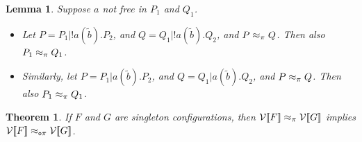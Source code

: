 \documentclass[11pt,a4paper]{amsart}
\theoremstyle{plain}
\theoremstyle{definition}
\theoremstyle{defC}
\theoremstyle{thmC}
\theoremstyle{plain}
\numberwithin{equation}{section}
\def\inp#1#2{#1(#2)}
\newcommand{\rmm}[1]{{\tt{\lowercase{#1}}}}
\newcommand{\genwb}[1]{\mathrel{\approx_{\rmm{\lowercase{#1}}}}}       %
\newcommand{\wbPI}{\genwb{\pi}}       %
\newcommand{\wbOPI}{\genwb{o\pi}}       %
\newcommand{\til}[1]{\widetilde{#1}}
\newcommand{\tilb}{{\til b}}
\newcommand{\tilx}{\tilde{x}}
\newcommand{\FF}{F}
\newcommand{\GG}{G}
\newcommand{\cbvSymb}{{\mathcal {V}}}
\newcommand{\encoEnvI}[1]{ \cbvSymb[\! [ #1 ] \! ]  } %
\newcommand{\encoConI}{\encoEnvI} %
\theoremstyle{plain}
\newtheorem{theorem}[thm]{Theorem}
\newtheorem{lemma}[thm]{Lemma}
\theoremstyle{definition}
\begin{document}
\begin{lemma}
\label{l:deco}
Suppose  $a$ not free in $P_1 $ and $Q_1$. 
\begin{itemize}
\item
Let $P = P_1 | ! \inp a {\tilb}.P_2$, 
and $Q = Q_1 | ! \inp a {\tilb}.Q_2$, 
and  $ P \wbPI  Q$.
Then also 
  $ {P_1}  \wbPI  {Q_1}$.


\item 
Similarly, let $P = P_1 |  \inp a {\tilb}.P_2$, 
and $Q = Q_1 |  \inp a {\tilb}.Q_2$, 
and  $ {P} \wbPI  {Q}$.
Then also 
  $ {P_1}  \wbPI  {Q_1}$.
\end{itemize}
\end{lemma} 

\begin{theorem}
\label{t:opBIS_BIS}
If $\FF$ and $\GG$ are singleton configurations, then
$\encoConI  \FF \wbPI \encoConI  \GG $  implies 
 $\encoConI  \FF \wbOPI \encoConI  \GG $.
\end{theorem} 
\end{document}
